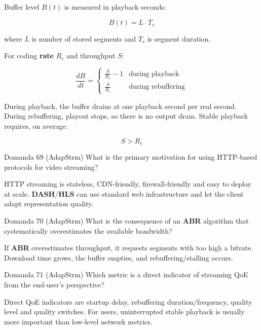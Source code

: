 Buffer level $B(t)$ is measured in playback seconds:


$$
B(t)=L\cdot T_s
$$


where $L$ is number of stored segments and $T_s$ is segment duration.

For coding \textbf{rate} $R_c$ and throughput $S$:


$$
\frac{dB}{dt}=
\begin{cases}
\frac{S}{R_c}-1 & \text{during playback}\\
\frac{S}{R_c} & \text{during rebuffering}
\end{cases}
$$


During playback, the buffer drains at one playback second per real second. During rebuffering, playout stops, so there is no output drain. Stable playback requires, on average:


$$
S>R_c
$$




\begin{questionbox}{Domanda 69}
(AdapStrm) What is the primary motivation for using HTTP-based protocols for video streaming?
\end{questionbox}


HTTP streaming is stateless, CDN-friendly, firewall-friendly and easy to deploy at scale. \textbf{DASH}/\textbf{HLS} can use standard web infrastructure and let the client adapt representation quality.



\begin{questionbox}{Domanda 70}
(AdapStrm) What is the consequence of an \textbf{ABR} algorithm that systematically overestimates the available bandwidth?
\end{questionbox}


If \textbf{ABR} overestimates throughput, it requests segments with too high a bitrate. Download time grows, the buffer empties, and rebuffering/stalling occurs.



\begin{questionbox}{Domanda 71}
(AdapStrm) Which metric is a direct indicator of streaming QoE from the end-user’s perspective?
\end{questionbox}


Direct QoE indicators are startup delay, rebuffering duration/frequency, quality level and quality switches. For users, uninterrupted stable playback is usually more important than low-level network metrics.



